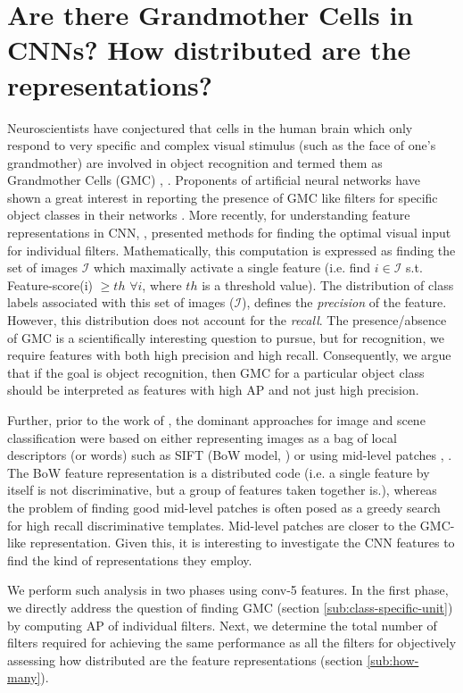 \section{Are there Grandmother Cells in CNNs? How distributed are the representations?}
\label{sec:grand-mother}
Neuroscientists have conjectured that cells in the human brain which only respond to very specific and complex visual stimulus (such as the face of one's grandmother) are involved in object recognition and termed them as Grandmother Cells (GMC) \cite{Barlow}, \cite{Grandmother}. Proponents of artificial neural networks have shown a great interest in reporting the presence of GMC like filters for specific object classes in their networks \cite{GoogleCat}. More recently, for understanding feature representations in CNN, \cite{DeConv}, \cite{Simonyan} presented methods for finding the optimal visual input for individual filters. Mathematically, this computation is expressed as finding the set of images $\mathcal{I}$ which maximally activate a single feature (i.e. find $i \in \mathcal{I}$ s.t. Feature-score(i) $\geq th$ $\forall i $, where $th$ is a threshold value). The distribution of class labels associated with this set of images ($\mathcal{I}$), defines the \textit{precision} of the feature. However, this distribution does not account for the \textit{recall}.  The presence/absence of GMC is a scientifically interesting question to pursue, but for recognition, we require features with both high precision and high recall. Consequently, we argue that if the goal is object recognition, then GMC for a particular object class should be interpreted as features with high AP and not just high precision. 
 
Further, prior to the work of \cite{Kriz}, the dominant approaches for image and scene classification were based on either representing images as a bag of local descriptors (or words) such as SIFT (BoW model, \cite{SPM}) or using mid-level patches \cite{Mid1}, \cite{Blocks}. The BoW feature representation is a distributed code (i.e. a single feature by itself is not discriminative, but a group of features taken together is.), whereas the problem of finding good mid-level patches is often posed as a greedy search for high recall discriminative templates. Mid-level patches are closer to the GMC-like representation. Given this, it is interesting to investigate the CNN features to find the kind of representations they employ.

We perform such analysis in two phases using conv-5 features. In the first phase, we directly address the question of finding GMC (section \ref{sub:class-specific-unit}) by computing AP of individual filters. Next, we determine the total number of filters required for achieving the same performance as all the filters for objectively assessing how distributed are the feature representations (section \ref{sub:how-many}).

